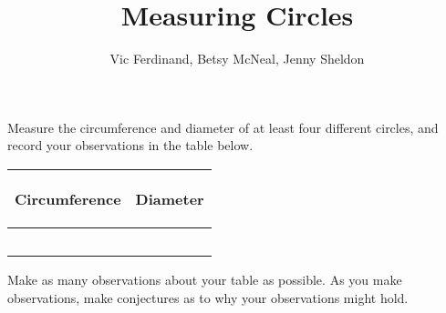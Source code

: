 \documentclass{ximera}
\title{Measuring Circles}
\author{Vic Ferdinand, Betsy McNeal, Jenny Sheldon}
\begin{document}
\begin{abstract}
\end{abstract}
\maketitle



\begin{problem} 
Measure the circumference and diameter of at least four different circles, and record your observations in the table below.
\vskip 0.1in
\begin{tabular}{|p{2.2in}|p{2.2in}|}
\hline
\begin{center} Circumference \end{center} & \begin{center} Diameter \end{center}  \\ \hline
 & \\ [5ex] \hline
 & \\ [5 ex] \hline
 & \\ [5 ex] \hline
 & \\ [5 ex] \hline
 & \\ [5 ex] \hline
\end{tabular}
\end{problem}

\begin{problem}
Make as many observations about your table as possible.  As you make observations, make conjectures as to why your observations might hold.

\end{problem}
\end{document}
